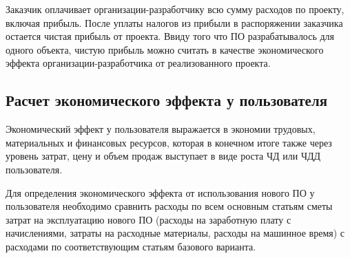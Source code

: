 Заказчик оплачивает организации-разработчику всю сумму расходов по проекту, включая прибыль. После уплаты налогов из прибыли в распоряжении заказчика остается чистая прибыль от проекта. Ввиду того что ПО разрабатывалось для одного объекта, чистую прибыль можно считать в качестве экономического эффекта организации-разработчика от реализованного проекта.

\subsection{Расчет экономического эффекта у пользователя}
Экономический эффект у пользователя выражается в экономии трудовых, материальных и финансовых ресурсов, которая в конечном итоге также через уровень затрат, цену и объем продаж выступает в виде роста ЧД или ЧДД пользователя.

Для определения экономического эффекта от использования нового ПО у пользователя необходимо сравнить расходы по всем основным статьям сметы затрат на эксплуатацию нового ПО (расходы на заработную плату с начислениями, затраты на расходные материалы, расходы на машинное время) с расходами по соответствующим статьям базового варианта.

